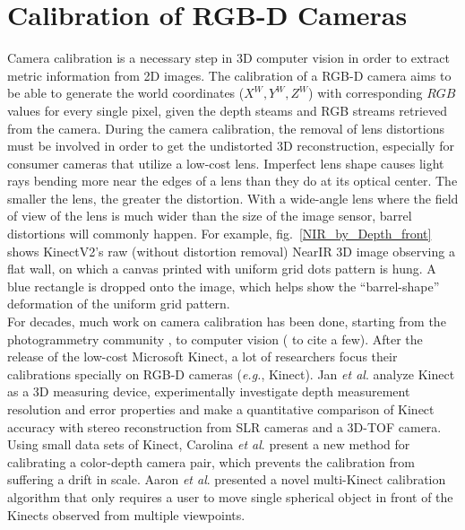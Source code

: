 \section{Calibration of RGB-D Cameras}
\label{sectionRGBDcameraCalibration}
\indent
Camera calibration is a necessary step in 3D computer vision in order to extract metric information from 2D images. The calibration of a RGB-D camera aims to be able to generate the world coordinates (\(X^W, Y^W, Z^W\)) with corresponding \(RGB\) values for every single pixel, given the depth steams and RGB streams retrieved from the camera. During the camera calibration, the removal of lens distortions must be involved in order to get the undistorted 3D reconstruction, especially for consumer cameras that utilize a low-cost lens. Imperfect lens shape causes light rays bending more near the edges of a lens than they do at its optical center. The smaller the lens, the greater the distortion. With a wide-angle lens where the field of view of the lens is much wider than the size of the image sensor, barrel distortions will commonly happen. For example, fig.~\ref{NIR_by_Depth_front} shows KinectV2's raw (without distortion removal) NearIR 3D image observing a flat wall, on which a canvas printed with uniform grid dots pattern is hung. A blue rectangle is dropped onto the image, which helps show the \enquote{barrel-shape} deformation of the uniform grid pattern.
\\\indent
For decades, much work on camera calibration has been done, starting from the photogrammetry community \cite{photogrammetry01_1971} \cite{photogrammetry02_1975}, to computer vision (\cite{Tsai1987} \cite{treeDcalibration1_1993} \cite{Zhengyou04} to cite a few). After the release of the low-cost Microsoft Kinect, a lot of researchers focus their calibrations specially on RGB-D cameras (\textit{e.g.}, Kinect). Jan \textit{et al}. \cite{KinectCali01_2011} analyze Kinect as a 3D measuring device, experimentally investigate depth measurement resolution and error properties and make a quantitative comparison of Kinect accuracy with stereo reconstruction from SLR cameras and a 3D-TOF camera. Using small data sets of Kinect, Carolina \textit{et al}. \cite{KinectCali02_2013} present a new method for calibrating a color-depth camera pair, which prevents the calibration from suffering a drift in scale. Aaron \textit{et al}. \cite{KinectCali03_2015} presented a novel multi-Kinect calibration algorithm that only requires a user to move single spherical object in front of the Kinects observed from multiple viewpoints.
\\\indent
